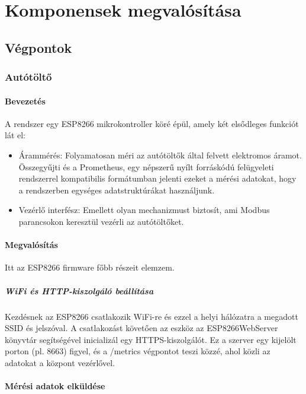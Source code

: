 \chapter{Komponensek megvalósítása}

\section{Végpontok}

\subsection{Autótöltő}

\subsubsection{Bevezetés}
A rendszer egy ESP8266 mikrokontroller köré épül, amely két elsődleges funkciót lát el:
\begin{itemize}
    \item Árammérés: Folyamatosan méri az autótöltők által felvett elektromos áramot. Összegyűjti és a Prometheus, 
    egy népszerű nyílt forráskódú felügyeleti rendszerrel kompatibilis formátumban jelenti ezeket a mérési adatokat, 
    hogy a rendszerben egységes adatstruktúrákat használjunk.
    \item Vezérlő interfész: Emellett olyan mechanizmust biztosít, ami Modbus parancsokon keresztül vezérli az 
    autótöltőket.
\end{itemize}

\subsubsection{Megvalósítás}
Itt az ESP8266 firmware főbb részeit elemzem.
\paragraph{WiFi és HTTP-kiszolgáló beállítása}
Kezdésnek az ESP8266 csatlakozik WiFi-re és ezzel a helyi hálózatra a megadott SSID és jelszóval. 
A csatlakozást követően az eszköz az ESP8266WebServer könyvtár segítségével inicializál egy HTTPS-kiszolgálót. 
Ez a szerver egy kijelölt porton (pl. 8663) figyel, és a /metrics végpontot teszi közzé, 
ahol közli az adatokat a központ vezérlővel.

\subsubsection{Mérési adatok elküldése}

